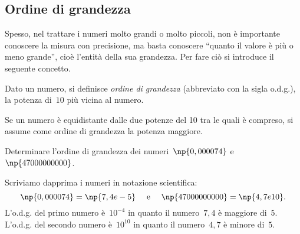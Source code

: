 \ovalbox{\risolvii \ref{ese:3.66}, \ref{ese:3.67}, \ref{ese:3.68}, \ref{ese:3.69}, \ref{ese:3.70}, \ref{ese:3.71},
\ref{ese:3.72}, \ref{ese:3.73}}

\subsection{Ordine di grandezza}

Spesso, nel trattare i numeri molto grandi o molto piccoli, non è importante conoscere
la misura con precisione, ma basta conoscere ``quanto il valore è più o meno grande'',
cioè l'entità della sua grandezza. Per fare ciò si introduce il seguente concetto.

\begin{definizione}
Dato un numero, si definisce \emph{ordine di grandezza} (abbreviato con la sigla o.d.g.),
la potenza di~$10$ più vicina al numero.
\end{definizione}

Se un numero è equidistante dalle due potenze del 10 tra le quali è compreso, si assume come ordine di grandezza la potenza maggiore.


\begin{exrig}
 \begin{esempio}
Determinare l'ordine di grandezza dei numeri~$\np{0,000074}$ e~$\np{47000000000}$.

Scriviamo dapprima i numeri in notazione scientifica:
\[\np{0,000074}=\np{7,4e-5}\quad\text{ e }\quad \np{47000000000}=\np{4,7e10}.\]
L'o.d.g. del primo numero è~$10^{-4}$ in quanto il numero~$7,4$ è maggiore di~$5$.
L'o.d.g. del secondo numero è~$10^{10}$ in quanto il numero~$4,7$ è minore di~$5$.
 \end{esempio}
\end{exrig}

\ovalbox{\risolvii \ref{ese:3.74}, \ref{ese:3.75}, \ref{ese:3.76}}


